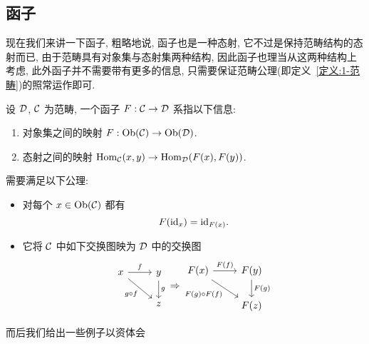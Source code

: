 \subsection{函子}
现在我们来讲一下函子, 粗略地说, 函子也是一种态射, 它不过是保持范畴结构的态射而已, 由于范畴具有对象集与态射集两种结构, 因此函子也理当从这两种结构上考虑, 此外函子并不需要带有更多的信息, 只需要保证范畴公理(即定义~\ref{定义:1-范畴})的照常运作即可.
\begin{definition}[函子]
    设 $\cal{D}$, $\cal{C}$ 为范畴, 一个函子 $F: \cal{C} \to \cal{D}$ 系指以下信息:
    \begin{enumerate}
        \item 对象集之间的映射 $F: \operatorname{Ob}(\cal{C}) \to \operatorname{Ob}(\cal{D})$.
        \item 态射之间的映射 $\operatorname{Hom}_{\cal{C}}(x,y)\to \operatorname{Hom}_{\cal{D}}(F(x),F(y))$.
    \end{enumerate}
    需要满足以下公理:
    \begin{itemize}
        \item 对每个 $x\in \operatorname{Ob}(\cal{C})$ 都有
        \[
        F(\mathrm{id}_x) = \mathrm{id}_{F(x)}.
        \]
        \item 它将 $\cal{C}$ 中如下交换图映为 $\cal{D}$ 中的交换图
        \[\begin{tikzcd}
	x & y \\
	& z
	\arrow["f", from=1-1, to=1-2]
	\arrow["{g\circ f}"', from=1-1, to=2-2]
	\arrow["g", from=1-2, to=2-2]
       \end{tikzcd} \Rightarrow 
       \begin{tikzcd}
	{F(x)} & {F(y)} \\
	& {F(z)}
	\arrow["{F(f)}", from=1-1, to=1-2]
	\arrow["{F(g)\circ F(f)}"', from=1-1, to=2-2]
	\arrow["{F(g)}", from=1-2, to=2-2]
        \end{tikzcd}\]
    \end{itemize}
\end{definition}
而后我们给出一些例子以资体会
